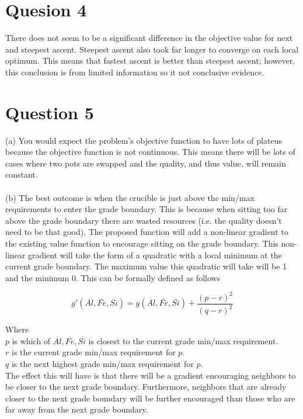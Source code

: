 \documentclass{article}
\begin{document}
\section{Quesion 4}
There does not seem to be a significant difference in the objective
value for next and steepest ascent. Steepest ascent also took far
longer to converge on each local optimum. This means that fastest
ascent is better than steepest ascent; however, this conclusion is from
limited information so it not conclusive evidence.

\section{Question 5}
(a) You would expect the problem's objective function to have lots of 
plateus because the objective function is not continuous. This means
there will be lots of cases where two pots are swapped and the
quality, and thus value, will remain constant.\\\\

\noindent (b) The best outcome is when the crucible is just above
the min/max requirements to enter the grade boundary. This is because
when sitting too far above the grade boundary there are wasted
resources (i.e. the quality doesn't need to be that good).
The proposed function will add a non-linear gradient to the existing
value function to encourage sitting on the grade boundary. This 
non-linear gradient will take the form of a quadratic with a local
minimum at the current grade boundary. The maximum value this
quadratic will take will be 1 and the minimum 0. This can be formally
defined as follows

\[
  g'(\overline{Al}, \overline{Fe}, \overline{Si}) = 
  g(\overline{Al}, \overline{Fe}, \overline{Si})
  + \displaystyle\frac{(p-r)^2}{(q-r)^2}
\]

Where\\
$p$ is which of $\overline{Al}, \overline{Fe}, \overline{Si}$ is
closest to the current grade min/max requirement.\\
$r$ is the current grade min/max requirement for $p$.\\
$q$ is the next highest grade min/max requirement for $p$.\\

The effect this will have is that there will be a gradient encouraging
neighbors to be closer to the next grade boundary. Furthermore,
neighbors that are already closer to the next grade boundary will be
further encouraged than those who are far away from the next grade 
boundary. \\
\end{document}
